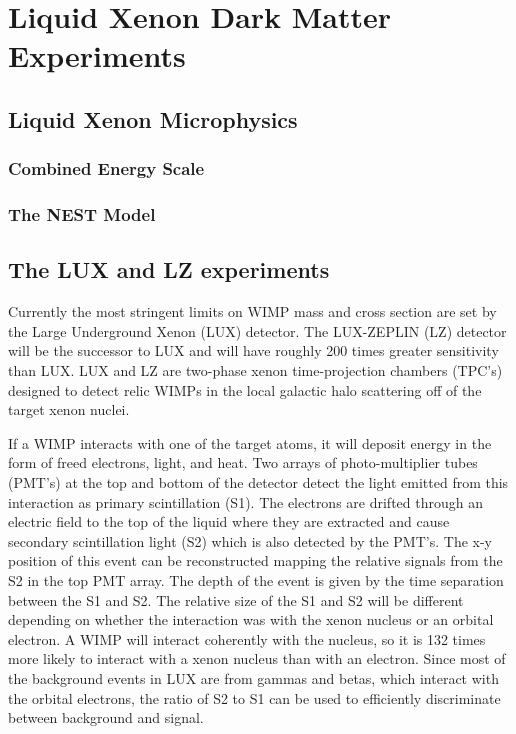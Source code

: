 \chapter{Liquid Xenon Dark Matter Experiments}

\section{Liquid Xenon Microphysics}


\subsection{Combined Energy Scale}

\subsection{The NEST Model}


\section{The LUX and LZ experiments}
Currently the most stringent limits on WIMP mass and cross section are set by the Large Underground Xenon (LUX) detector. The LUX-ZEPLIN (LZ) detector will be the successor to LUX and will have roughly 200 times greater sensitivity than LUX. LUX and LZ are two-phase xenon time-projection chambers (TPC's) designed to detect relic WIMPs in the local galactic halo scattering off of the target xenon nuclei. 

If a WIMP interacts with one of the target atoms, it will deposit energy in the form of freed electrons, light, and heat. Two arrays of photo-multiplier tubes (PMT's) at the top and bottom of the detector detect the light emitted from this interaction as primary scintillation (S1). The electrons are drifted through an electric field to the top of the liquid where they are extracted and cause secondary scintillation light (S2) which is also detected by the PMT's. The x-y position of this event can be reconstructed mapping the relative signals from the S2 in the top PMT array. The depth of the event is given by the time separation between the S1 and S2. The relative size of the S1 and S2 will be different depending on whether the interaction was with the xenon nucleus or an orbital electron. A WIMP will interact coherently with the nucleus, so it is 132 times more likely to interact with a xenon nucleus than with an electron. Since most of the background events in LUX are from gammas and betas, which interact with the orbital electrons, the ratio of S2 to S1 can be used to efficiently discriminate between background and signal.

